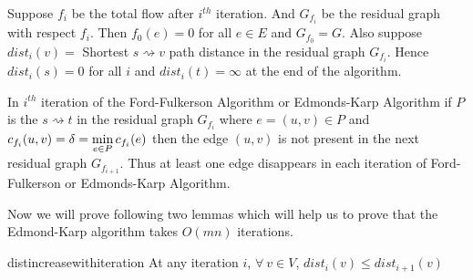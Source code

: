 Suppose $f_i$ be the total flow after $i^{th}$ iteration. And $G_{f_i}$ be the residual graph with respect $f_i$. Then $f_0(e)=0$ for all $e\in E$ and $G_{f_0}=G$. Also suppose $\textit{dist}_i(v)=$ Shortest $s\rightsquigarrow v$ path distance in the residual graph $G_{f_i}$. Hence $\textit{dist}_i(s)=0$ for all $i$ and $\textit{dist}_i(t)=\infty$ at the end of the algorithm.
\begin{note}
	In $i^{th}$ iteration of the Ford-Fulkerson Algorithm or Edmonds-Karp Algorithm if $P$ is the $s\rightsquigarrow t$ in the residual graph $G_{f_i}$ where $e=(u,v)\in P$  and $c_{f_i}(u,v)=\delta=\min\limits_{e\in P}c_{f_i}(e)$ then the edge $(u,v)$ is not present in the next residual graph $G_{f_{i+1}}$. Thus at least one edge disappears in each iteration of Ford-Fulkerson or Edmonds-Karp Algorithm.
\end{note}
Now we will prove following two lemmas which will help us to prove that the Edmond-Karp algorithm takes $O(mn)$ iterations.
\begin{lemma}{}{distincreasewithiteration}
	At any iteration $i$, 	$\forall\ v\in V$, $\textit{dist}_i(v)\leq\textit{dist}_{i+1}(v)$
\end{lemma}
